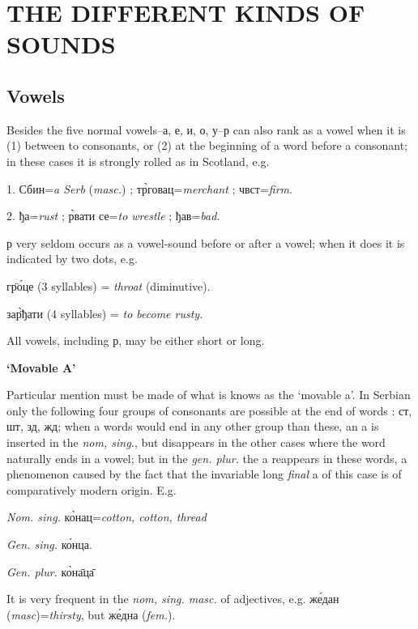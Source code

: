 
\vspace*{16pt}
\chapter{THE DIFFERENT KINDS OF SOUNDS}
\section{Vowels}

Besides the five normal vowels--а, е, и, о, у--р can also rank as a vowel when
it is (1) between to consonants, or (2) at the beginning of a word before a
consonant; in these cases it is strongly rolled as in Scotland, e.g.

1. Сбин=\emph{a Serb} (\emph{masc.}) ;
т\`{р}говац=\emph{merchant} ; чвст=\emph{firm}.

2. ђа=\emph{rust} ; \`{р}вати се=\emph{to wrestle} ;
ђав=\emph{bad}.

р  very seldom occurs as a vowel-sound before or after a vowel; when it does it
is  indicated by two dots, e.g.
\newpage

г\"{р}\'{о}це (3 syllables) = \emph{throat} (diminutive).

за\`{\"{р}}ђати (4 syllables) = \emph{to become rusty}.

All vowels, including р, may be either short or long.

\smallskip
{\hfill \large \textbf{`Movable A'} \hfill}

Particular mention must be made of what is knows as the `movable a'. In Serbian
only the following four groups of consonants are possible at the end of words :
ст, шт, зд, жд; when a words would end in any other group than these, an a is
inserted in the \emph{nom, sing.}, but disappears in the other cases where the
word naturally ends in a vowel; but in the \emph{gen. plur.} the a reappears in
these words, a phenomenon caused by the fact that the invariable long
\emph{final} a of this case is of comparatively modern origin.  E.g.

\emph{Nom. sing.} к\`{о}нац=\emph{cotton, cotton, thread}

\emph{Gen. sing.} к\'{о}нца.

\emph{Gen. plur.} к\`{о}н\={а}ц\={а}

It is very frequent in the \emph{nom, sing. masc.} of adjectives, e.g.
ж\'{е}дан (\emph{masc})=\emph{thirsty}, but ж\'{е}дна (\textit{fem.}).

